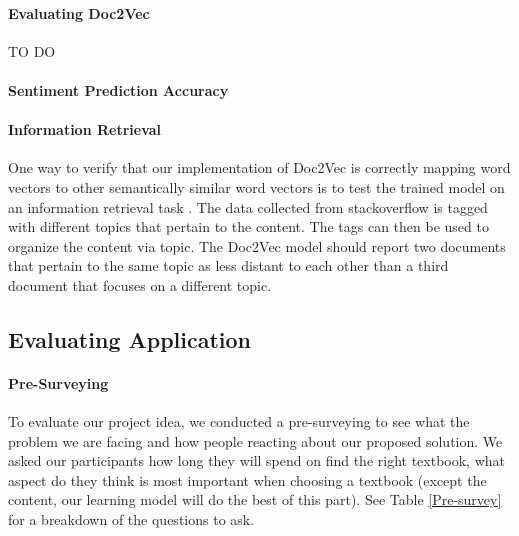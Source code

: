 \paragraph{Evaluating Doc2Vec}
TO DO

\paragraph{Sentiment Prediction Accuracy}
%
%
%
%

\paragraph{Information Retrieval}

One way to verify that our implementation of Doc2Vec is correctly mapping word vectors to other semantically similar word vectors is to test the trained model on an information retrieval task . \cite{RefWorks:doc:5a6e5746e4b0d609eec798d7} The data collected from stackoverflow is tagged with different topics that pertain to the content. The tags can then be used to organize the content via topic. The Doc2Vec model should report two documents that pertain to the same topic as less distant to each other than a third document that focuses on a different topic.

%
\subsection{Evaluating Application}
\paragraph{Pre-Surveying}
To evaluate our project idea, we conducted a pre-surveying to see what the problem we are facing and how people reacting about our proposed solution. We asked our participants how long they will spend on find the right textbook, what aspect do they think is most important when choosing a textbook (except the content, our learning model will do the best of this part). See Table \ref{Pre-survey} for a breakdown of the questions to ask.

